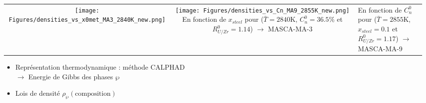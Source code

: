 \begin{frame}
\begin{columns}[T]
  \begin{column}{0.65\textwidth} 
\renewcommand{\arraystretch}{0.1}
\begin{tabularx}{\textwidth}{>{\setlength{\baselineskip}{0.5\baselineskip}}C >{\setlength{\baselineskip}{0.5\baselineskip}}C}
\texttt{[image: Figures/densities\_vs\_x0met\_MA3\_2840K\_new.png]} & \texttt{[image: Figures/densities\_vs\_Cn\_MA9\_2855K\_new.png]} \n
{\tiny En fonction de $x_{steel}$ pour ($\bar{T}=2840$K, $C_n^0=36.5\%$ et $R_{U/Zr}^0=1.14$) $\rightarrow$ MASCA-MA-3} & {\tiny En fonction de $C_n^0$ pour ($\bar{T}=2855$K, $x_{steel}=0.1$ et $R_{U/Zr}^0=1.17$) $\rightarrow$ MASCA-MA-9}
\end{tabularx}
\renewcommand{\arraystretch}{1.0}
      \baselineskip
\begin{itemize}
\item Représentation thermodynamique : méthode CALPHAD \\ $\rightarrow$ Energie de Gibbs des phases $\wp$
\item Lois de densité $\rho_{\wp}\left(\text{composition}\right)$
\end{itemize}
  \end{column}
\end{columns}
\end{frame}
